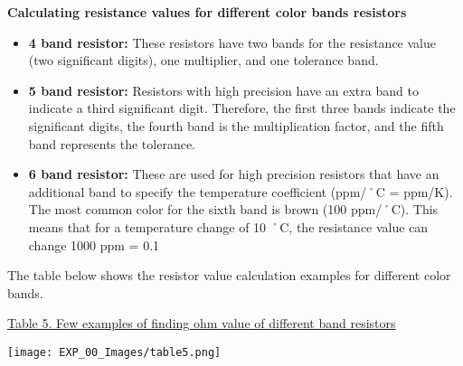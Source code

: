 \documentclass[12pt,a4paper]{article}
\begin{document}
\begin{justify}
\noindent \textbf{ Calculating resistance values for different color bands resistors}\\
\vspace{-4mm}
\begin{itemize}
\setlength\itemsep{-0.3em}
\item \textbf{4 band resistor:} These resistors have two bands for the resistance value (two significant digits), one multiplier, and one tolerance band.
\item \textbf{5 band resistor: }Resistors with high precision have an extra band to indicate a third significant digit. Therefore, the first three bands indicate the significant digits, the fourth band is the multiplication factor, and the fifth band represents the tolerance.
\item \textbf{6 band resistor: } These are used for high precision resistors that have an additional band to specify the temperature coefficient (ppm/˚C = ppm/K). The most common color for the sixth band is brown (100 ppm/˚C). This means that for a temperature change of 10 ˚C, the resistance value can change 1000 ppm = 0.1%

\end{itemize}
\nonindent The table below shows the resistor value calculation examples for different color bands.

    

\begin{center} {\href{https://www.diyaudioandvideo.com/Electronics/ResistorColorCodes} { Table 5. Few examples of finding ohm value of different band resistors}} \end{center}
\begin{center}
\vspace{-4mm}
\texttt{[image: EXP\_00\_Images/table5.png]} \end{center}

\end{justify}
\end{document}
